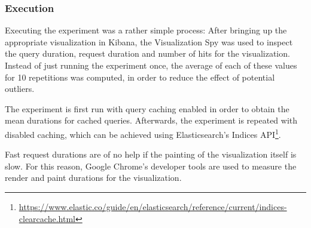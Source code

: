 %

\subsubsection{Execution}

Executing the experiment was a rather simple process:
After bringing up the appropriate visualization in Kibana, the Visualization Spy was used to inspect the query duration, request duration and number of hits for the visualization.
Instead of just running the experiment once, the average of each of these values for 10 repetitions was computed, in order to reduce the effect of potential outliers.

The experiment is first run with query caching enabled in order to obtain the mean durations for cached queries.
Afterwards, the experiment is repeated with disabled caching, which can be achieved using Elasticsearch's Indices API\footnote{\url{https://www.elastic.co/guide/en/elasticsearch/reference/current/indices-clearcache.html}}.

Fast request durations are of no help if the painting of the visualization itself is slow.
For this reason, Google Chrome's developer tools are used to measure the render and paint durations for the visualization.

